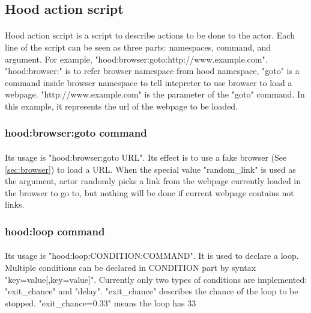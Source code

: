 \documentclass[mscthesis]{usiinfthesis}
\begin{document}
\subsection{Hood action script}
\paragraph{}
Hood action script is a script to describe actions to be done to the actor. Each line of the script can be seen as three parts: namespaces, command, and argument. For example, \newline "hood:browser:goto:http://www.example.com". "hood:browser:" is to refer browser namespace from hood namespace, "goto" is a command inside browser namespace to tell intepreter to use browser to load a webpage. "http://www.example.com" is the parameter of the "goto" command. In this example, it represents the url of the webpage to be loaded.
\subsubsection{hood:browser:goto command}
\paragraph{}
Its usage is "hood:browser:goto URL". Its effect is to use a fake browser (See \cref{sec:browser}) to load a URL. When the special value "random\_link" is used as the argument, actor randomly picks a link from the webpage currently loaded in the browser to go to, but nothing will be done if current webpage contains not links.
\subsubsection{hood:loop command}
\paragraph{}
Its usage is "hood:loop:CONDITION:COMMAND". It is used to declare a loop. Multiple conditions can be declared in CONDITION part by syntax "key=value[,key=value]". Currently only two types of conditions are implemented: "exit\_chance" and "delay". "exit\_chance" describes the chance of the loop to be stopped. "exit\_chance=0.33" means the loop has 33%
\end{document}

